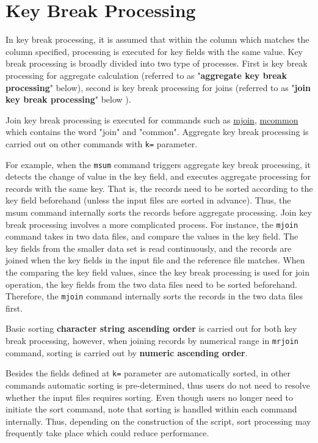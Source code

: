 
%

\section{Key Break Processing\label{sect:keybreak}}

In key break processing, it is assumed that within the column which matches the column specified, processing is executed for key fields with the same value. 
Key break processing is broadly divided into two type of processes. First is key break processing  for aggregate calculation (referred to as  "{\bf aggregate key break processing}" below), second is key break processing for joins (referred to as "{\bf join key break processing}" below ). 
 
Join key break processing is executed for commands such as \hyperref[sect:mjoin]{mjoin}, 
\hyperref[sect:mcommon]{mcommon} which contains the word "join" and "common". Aggregate key break processing is carried out on other commands with \verb|k=| parameter. 


For example, when the \verb|msum| command triggers aggregate key break processing, it detects the change of value in the key field, and executes aggregate processing for records with the same key. 
 That is, the records need to be sorted according to the key field beforehand (unless the input files are sorted in advance). Thus, the msum command internally sorts the records before aggregate processing.
Join key break processing involves a more complicated process. For instance, the \verb|mjoin| command takes in two data files, and compare the values in the key field.  The key fields from the smaller data set is read continuously, and the records are joined when the key fields in the input file and the reference file matches. When the comparing the key field values, since the key break processing is used for join operation,  the key fields from the two data files need to be sorted beforehand. 
Therefore, the \verb|mjoin| command internally sorts the records in the two data files first.

Basic sorting {\bf character string ascending order} is carried out for both key break processing, however, when joining records by numerical range in \verb|mrjoin| command, sorting is carried out by {\bf numeric ascending order}. 

Besides the fields defined at \verb|k=| parameter are automatically sorted, in other commands automatic sorting is pre-determined, thus users do not need to resolve whether the input files requires sorting. 
Even though users no longer need to initiate the sort command, note that sorting is handled within each command internally. Thus, depending on the construction of the script, sort processing may frequently take place which could reduce performance.  


